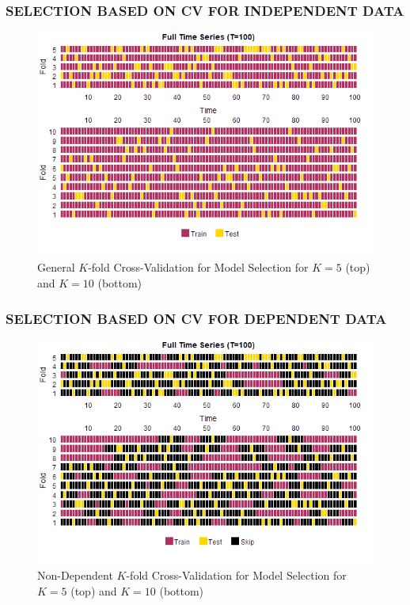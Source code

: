 \subsubsection{SELECTION BASED ON CV FOR INDEPENDENT DATA}

\begin{figure}[htbp!]
	\caption{General $K$-fold Cross-Validation for Model Selection for $K=5$ (top) and $K=10$ (bottom)}
	\label{fig:kcvplots}
	\includegraphics[scale=0.7]{kcvplots}
\end{figure}

\subsubsection{SELECTION BASED ON CV FOR DEPENDENT DATA}

\begin{figure}[htbp!]
	\caption{Non-Dependent $K$-fold Cross-Validation for Model Selection for $K=5$ (top) and $K=10$ (bottom)}
	\label{fig:depkcvplots}
	\includegraphics[scale=0.7]{depkcvplots}
\end{figure}

